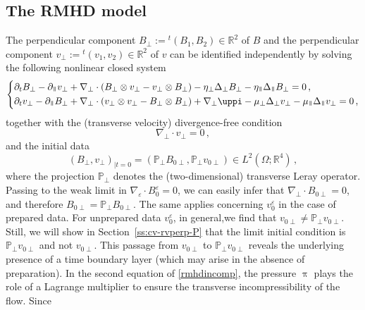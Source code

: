 \documentclass[11pt,reqno]{amsart}
\def \R{{\mathbb{R}}}
\def \P{{\mathbb{P}}}
\newcommand{\myparallel}{{\mkern3mu\vphantom{\perp}\vrule depth 0pt\mkern2mu\vrule depth 0pt\mkern3mu}}
\begin{document}

\subsection{The RMHD model}\label{ss:RHMD}
The perpendicular component $ B_\perp := {}^t(B_1,B_2) \in \R^2 $ of $ B $ and the perpendicular component $ v_\perp := {}^t(v_1,v_2) \in \R^2 $  of $ v $ can be identified independently by solving the following nonlinear closed system
\begin{equation}
\left \{
\begin{aligned}
  &\partial_t B_\perp -\partial_\myparallel v_\perp + \nabla_\perp \cdot (B_\perp \otimes v_\perp - v_\perp \otimes B_\perp)
  -\eta_\perp \Delta_\perp B_\perp -\eta_\myparallel \Delta_\myparallel B_\perp=0\,, \\
  &\partial_t v_\perp -\partial_\myparallel B_\perp + \nabla_\perp \cdot (v_\perp \otimes v_\perp - B_\perp \otimes B_\perp) + \nabla_\perp \uppi
  -\mu_\perp \Delta_\perp v_\perp -\mu_\myparallel \Delta_\myparallel v_\perp=0\, ,
\end{aligned}
\right.
\label{rmhdincomp}
\end{equation}
together with the (transverse velocity) divergence-free condition
\begin{equation}
  \label{divperp}
 \nabla_\perp \cdot v_\perp =0 \, ,
\end{equation}
and the initial data
\begin{equation}
  \label{inidatperp}
  (B_\perp,v_\perp)_{\mid t=0} = (\P_\perp B_{0 \perp} , \P_\perp v_{0 \perp}) \in L^2(\Omega;\R^4)\, ,
\end{equation}
where the projection $ \P_\perp $ denotes the (two-dimensional) transverse Leray operator. Passing to the weak limit in $ \nabla_\varepsilon \cdot B_0^\varepsilon = 0 $, we can easily infer that $ \nabla_\perp \cdot B_{0\perp} =0$, and therefore $ B_{0 \perp} = \P_\perp B_{0 \perp} $. The same applies concerning $ v_0^\varepsilon $ in the case of prepared data. For unprepared data $ v_0^\varepsilon $, in general,we find that $ v_{0 \perp} \not = \P_\perp v_{0 \perp}$. Still, we will show in Section~\ref{ss:cv-rvperp-P} that  the limit initial condition is $\P_\perp v_{0\perp}$ and not $ v_{0\perp} $. This passage from $ v_{0 \perp} $ to $ \P_\perp v_{0 \perp} $ reveals the underlying presence of a time boundary layer (which may arise in the absence of preparation). In the second equation of \eqref{rmhdincomp}, the pressure $\uppi$ plays the role of a Lagrange multiplier to ensure the transverse incompressibility of the flow. Since
\end{document}
